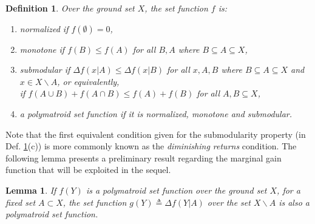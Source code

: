 \documentclass[conference]{IEEEtran}
\newtheorem{lemma}{Lemma}
\newtheorem{definition}{Definition}
\begin{document}
\begin{definition} \label{Def:Submodularity}
Over the ground set $X$, the set function $f$ is:
\begin{enumerate}[label=(\alph*)]
    \item \emph{normalized} if $f(\emptyset) = 0$,
    \item \emph{monotone} if $f(B) \leq f(A)$ for all $B,A$ where $B \subseteq A \subseteq X$,
    \item \emph{submodular} if $\Delta f(x\vert A) \leq \Delta f(x\vert B)$ for all $x,A,B$ where $B\subseteq A \subseteq X$ and $x\in X \backslash A$, or equivalently, \\if $f(A\cup B) + f(A\cap B) \leq f(A) + f(B)$ for all $A,B\subseteq X$,
    \item a \emph{polymatroid} set function \cite{Liu2018} if it is normalized, monotone and submodular. 
\end{enumerate}
\end{definition}



Note that the first equivalent condition given for the submodularity property (in Def. \ref{Def:Submodularity}(c)) is more commonly known as the \emph{diminishing returns} condition. The following lemma presents a preliminary result regarding the marginal gain function that will be exploited in the sequel. 

\begin{lemma}\label{Lm:MarginalGain}
If $f(Y)$ is a polymatroid set function over the ground set $X$, for a fixed set $A\subset X$, the set function $g(Y) \triangleq \Delta f(Y \vert A)$ over the set $X \backslash A$ is also a  polymatroid set function.
\end{lemma}
\end{document}
